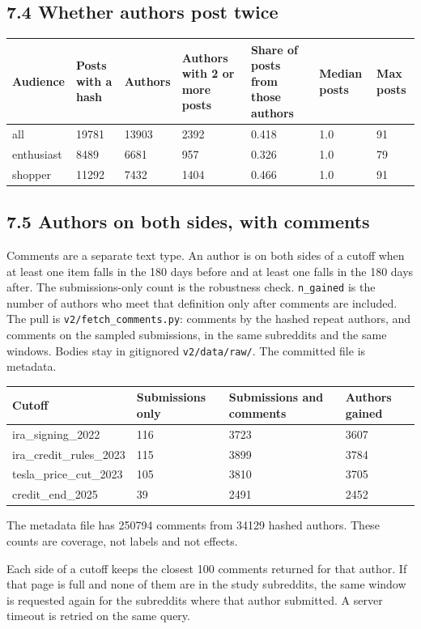\documentclass[11pt]{article}
\begin{document}
\subsection{7.4 Whether authors post twice}

\begin{longtable}{lllllll}
\toprule
Audience & Posts with a hash & Authors & Authors with 2 or more posts & Share of posts from those authors & Median posts & Max posts \\
\midrule
all & 19781 & 13903 & 2392 & 0.418 & 1.0 & 91 \\
enthusiast & 8489 & 6681 & 957 & 0.326 & 1.0 & 79 \\
shopper & 11292 & 7432 & 1404 & 0.466 & 1.0 & 91 \\
\bottomrule
\end{longtable}


\subsection{7.5 Authors on both sides, with comments}

Comments are a separate text type. An author is on both sides of a cutoff when at least one item falls in the 180 days before and at least one falls in the 180 days after. The submissions-only count is the robustness check. \texttt{n\_gained} is the number of authors who meet that definition only after comments are included. The pull is \texttt{v2/fetch\_comments.py}: comments by the hashed repeat authors, and comments on the sampled submissions, in the same subreddits and the same windows. Bodies stay in gitignored \texttt{v2/data/raw/}. The committed file is metadata.


\begin{longtable}{llll}
\toprule
Cutoff & Submissions only & Submissions and comments & Authors gained \\
\midrule
ira\_signing\_2022 & 116 & 3723 & 3607 \\
ira\_credit\_rules\_2023 & 115 & 3899 & 3784 \\
tesla\_price\_cut\_2023 & 105 & 3810 & 3705 \\
credit\_end\_2025 & 39 & 2491 & 2452 \\
\bottomrule
\end{longtable}


The metadata file has 250794 comments from 34129 hashed authors. These counts are coverage, not labels and not effects.


Each side of a cutoff keeps the closest 100 comments returned for that author. If that page is full and none of them are in the study subreddits, the same window is requested again for the subreddits where that author submitted. A server timeout is retried on the same query.
\end{document}
